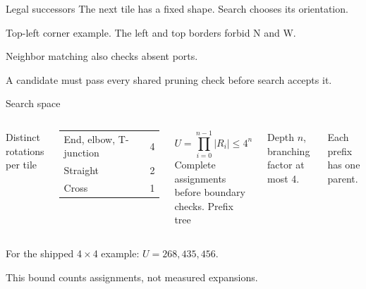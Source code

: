\begin{frame}{Legal successors}
The next tile has a fixed shape. Search chooses its orientation.
\vspace{5mm}
\begin{center}
\end{center}
\small Top-left corner example. The left and top borders forbid N and W.\par
\vspace{4mm}
\normalsize Neighbor matching also checks absent ports.\par
\small A candidate must pass every shared pruning check before search accepts it.
\end{frame}

\begin{frame}{Search space}
\begin{columns}[T,onlytextwidth]
\small Distinct rotations per tile\par\vspace{3mm}
\begin{tabular}{@{}lr@{}}\toprule
End, elbow, T-junction & 4\\
Straight & 2\\
Cross & 1\\\bottomrule
\end{tabular}
\vspace{4mm}
\normalsize
\[U=\prod_{i=0}^{n-1}|R_i|\leq 4^n\]
\small Complete assignments before boundary checks.
\small Prefix tree\par\vspace{3mm}
\par\small Depth $n$, branching factor at most 4.\par
Each prefix has one parent.
\end{columns}
\vspace{4mm}
For the shipped 4\,$\times$\,4 example: $U=268{,}435{,}456$.\par
\small This bound counts assignments, not measured expansions.
\end{frame}

